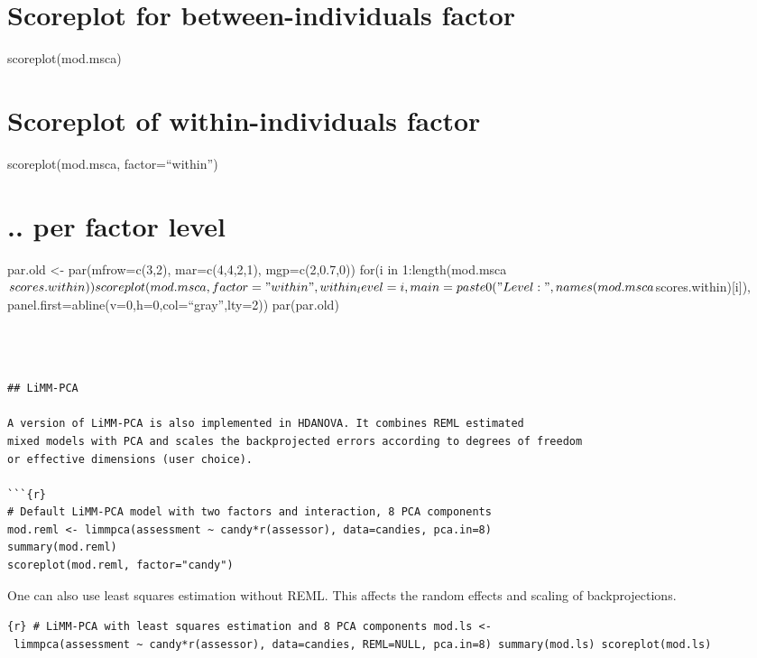 \section{Scoreplot for between-individuals
factor}\label{scoreplot-for-between-individuals-factor}

scoreplot(mod.msca)

\section{Scoreplot of within-individuals
factor}\label{scoreplot-of-within-individuals-factor}

scoreplot(mod.msca, factor=``within'')

\section{.. per factor level}\label{per-factor-level}

par.old \textless- par(mfrow=c(3,2), mar=c(4,4,2,1), mgp=c(2,0.7,0))
for(i in 1:length(mod.msca\(scores.within))
 scoreplot(mod.msca, factor="within", within_level=i,
           main=paste0("Level: ", names(mod.msca\)scores.within){[}i{]}),
panel.first=abline(v=0,h=0,col=``gray'',lty=2)) par(par.old)

\begin{verbatim}



## LiMM-PCA

A version of LiMM-PCA is also implemented in HDANOVA. It combines REML estimated
mixed models with PCA and scales the backprojected errors according to degrees of freedom
or effective dimensions (user choice).

```{r}
# Default LiMM-PCA model with two factors and interaction, 8 PCA components
mod.reml <- limmpca(assessment ~ candy*r(assessor), data=candies, pca.in=8)
summary(mod.reml)
scoreplot(mod.reml, factor="candy")
\end{verbatim}

One can also use least squares estimation without REML. This affects the
random effects and scaling of backprojections.

\texttt{\{r\}\ \#\ LiMM-PCA\ with\ least\ squares\ estimation\ and\ 8\ PCA\ components\ mod.ls\ \textless{}-\ limmpca(assessment\ \textasciitilde{}\ candy*r(assessor),\ data=candies,\ REML=NULL,\ pca.in=8)\ summary(mod.ls)\ scoreplot(mod.ls)}
